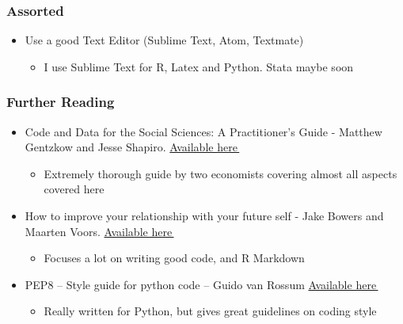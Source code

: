\documentclass{beamer}
\let\orighref\href
\renewcommand{\href}[2]{\orighref{#1}{#2\,\faExternalLink}} %
\begin{document}
\begin{frame}[t]\frametitle{Assorted}
	\begin{itemize}
		\item Use a good Text Editor (Sublime Text, Atom, Textmate)
		\begin{itemize}
			\item I use Sublime Text for R, Latex and Python. Stata maybe soon
		\end{itemize}
	\end{itemize}
\end{frame}

\begin{frame}[t]\frametitle{Further Reading}
	\begin{itemize}
		\item Code and Data for the Social Sciences: A Practitioner's Guide - Matthew Gentzkow and Jesse Shapiro.  \href{http://web.stanford.edu/\~gentzkow/research/CodeAndData.pdf}{Available here} 
		\begin{itemize}
			\item Extremely thorough guide by two economists covering almost all aspects covered here 
		\end{itemize}
		\item How to improve your relationship with your future self -  Jake Bowers and Maarten Voors.  \href{www.revistacienciapolitica.cl/index.php/rcp/article/download/291/22}{Available here} 
		\begin{itemize}
			\item Focuses a lot on writing good code, and R Markdown
		\end{itemize}
		\item PEP8 -- Style guide for python code --  Guido van Rossum   \href{https://legacy.python.org/dev/peps/pep-0008/}{Available here} 
		\begin{itemize}
			\item Really written for Python, but gives great guidelines on coding style
		\end{itemize}
	\end{itemize}
\end{frame}
\end{document}
